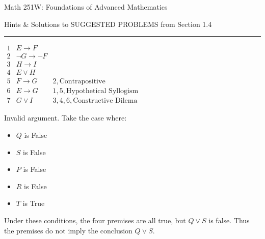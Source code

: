 \documentclass{article}
\theoremstyle{definition}
\begin{document}
	\begin{center}
		\Large{Math 251W: Foundations of Advanced Mathematics}

		\normalsize Hints \& Solutions to SUGGESTED PROBLEMS from Section
		1.4
		\vspace{0.25cm}
		\hrule
		\vspace{0.75cm}
	\end{center}

	 \vspace{0.5cm}




	\noindent {} \vspace{0.2cm}

	$\begin{array}{llr}
		 1 & E\rightarrow F&\\
		 2 & \neg G\rightarrow \neg F&\\
		 3 & H\rightarrow I & \\
		 4 & E \vee H & \\\hline
		 5 & F\rightarrow G& 2, \mbox{Contrapositive}\\
		 6 & E\rightarrow G & 1, 5, \mbox{Hypothetical Syllogism}\\
		 7 & G\vee I & 3, 4, 6, \mbox{Constructive Dilema}
	\end{array}$

	\vspace{0.25cm}

	\noindent {}\vspace{0.2cm}

	Invalid argument. Take the case where:
	\begin{itemize}
		\item $Q$ is False
		\item $S$ is False
		\item $P$ is False
		\item $R$ is False
		\item $T$ is True
	\end{itemize}
	Under these conditions, the four premises are all true, but $Q\vee
	S$ is false. Thus the premises do not imply the conclusion $Q\vee
	S$.

	\vspace{0.6cm}
\end{document}
